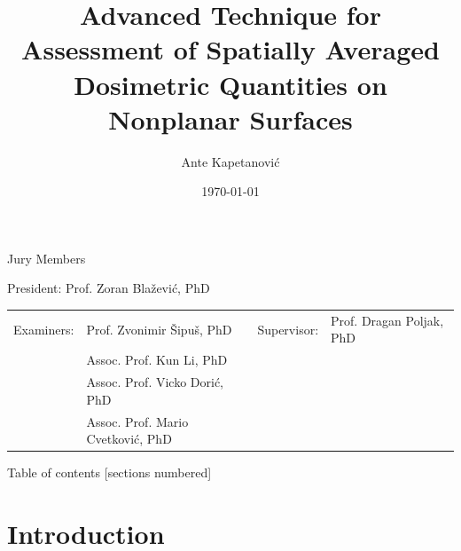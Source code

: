 \documentclass[xcolor=dvipsnames,10pt]{beamer}
\title{Advanced Technique for Assessment of Spatially Averaged Dosimetric Quantities on Nonplanar Surfaces}
\author[Ante Kapetanović]{Ante Kapetanović}
\institute{Faculty of Electrical Engineering, Mechanical Engineering and Naval Architecture (FESB)}
\date{\today}
\begin{document}
\begin{frame}[plain]
    \maketitle
    \begin{center}
        \scriptsize{%
            Jury Members\par
            President: Prof. Zoran Blažević, PhD\par\medskip
            \begin{table}
                \centering
                \begin{tabular}{llll}
                Examiners: & Prof. Zvonimir Šipuš, PhD & Supervisor: & Prof. Dragan Poljak, PhD \\
                 & Assoc. Prof. Kun Li, PhD &  &  \\
                 & Assoc. Prof. Vicko Dorić, PhD &  &  \\
                 & Assoc. Prof. Mario Cvetković, PhD &  & 
                \end{tabular}
            \end{table}
        }%
    \end{center}
\end{frame}

\begin{frame}{Table of contents}    
    [sections numbered]
        \tableofcontents
\end{frame}




\section[Introduction]{Introduction}
\end{document}

